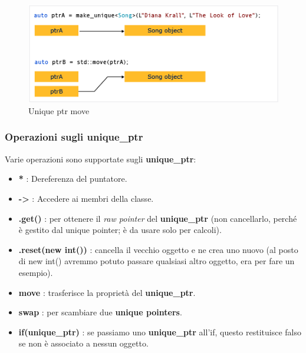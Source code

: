 \begin{figure}[H]
	\centering
	\includegraphics[width=1\textwidth, height=1\textheight, keepaspectratio]{./imgs/unique_ptr_move2.png}
	\caption{Unique ptr move}
	\label{fig:unique_ptr_move2}
\end{figure}

\subsubsection{Operazioni sugli unique\_ptr}

\textsf{\small Varie operazioni sono supportate sugli \textbf{unique\_ptr}: } \\

\begin{itemize}
	\item \textsf{\small \textbf{*} : Dereferenza del puntatore.}
	\item \textsf{\small \textbf{->} : Accedere ai membri della classe.}
	\item \textsf{\small \textbf{.get()} : per ottenere il \emph{raw pointer} del \textbf{unique\_ptr} (non cancellarlo, perché è gestito dal unique pointer; è da usare solo per calcoli).}
	\item \textsf{\small \textbf{.reset(new int())} : cancella il vecchio oggetto e ne crea uno nuovo (al posto di new int() avremmo potuto passare qualsiasi altro oggetto, era per fare un esempio).}
	\item \textsf{\small \textbf{move} : trasferisce la proprietà del \textbf{unique\_ptr}.}
	\item \textsf{\small \textbf{swap} : per scambiare due \textbf{unique pointers}.}
	\item \textsf{\small \textbf{if(unique\_ptr)} : se passiamo uno \textbf{unique\_ptr} all'if, questo restituisce falso se non è associato a nessun oggetto.}
\end{itemize}


